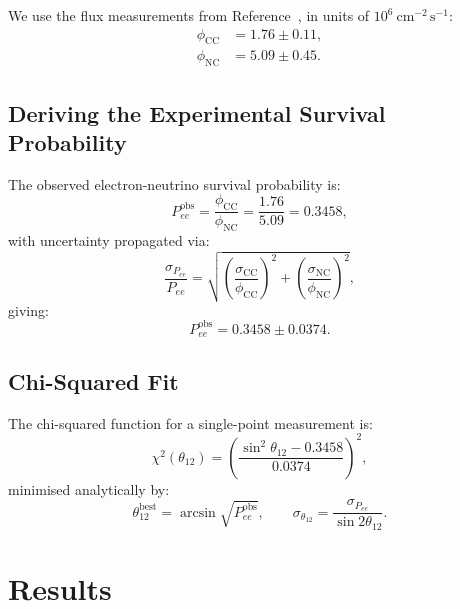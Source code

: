 \documentclass[12pt, a4paper]{article}
\begin{document}
We use the flux measurements from Reference~\cite{SNO2002}, in units of
$10^6\ \text{cm}^{-2}\,\text{s}^{-1}$:
\begin{align}
    \phi_\text{CC} &= 1.76 \pm 0.11, \label{eq:phicc}\\
    \phi_\text{NC} &= 5.09 \pm 0.45. \label{eq:phinc}
\end{align}
 
\subsection{Deriving the Experimental Survival Probability}
 
The observed electron-neutrino survival probability is:
\begin{equation}
    P_{ee}^{\text{obs}}
    = \frac{\phi_\text{CC}}{\phi_\text{NC}}
    = \frac{1.76}{5.09}
    = 0.3458,
    \label{eq:peeobs}
\end{equation}
with uncertainty propagated via:
\begin{equation}
    \frac{\sigma_{P_{ee}}}{P_{ee}}
    = \sqrt{\left(\frac{\sigma_\text{CC}}{\phi_\text{CC}}\right)^2
           +\left(\frac{\sigma_\text{NC}}{\phi_\text{NC}}\right)^2},
    \label{eq:errprop}
\end{equation}
giving:
\begin{equation}
    P_{ee}^{\text{obs}} = 0.3458 \pm 0.0374.
    \label{eq:peeobs_final}
\end{equation}
 
\subsection{Chi-Squared Fit}
 
The chi-squared function for a single-point measurement is:
\begin{equation}
    \chi^2(\theta_{12})
    = \left(
        \frac{\sin^2\theta_{12} - 0.3458}{0.0374}
      \right)^2,
    \label{eq:chi2}
\end{equation}
minimised analytically by:
\begin{equation}
    \theta_{12}^{\text{best}}
    = \arcsin\!\sqrt{P_{ee}^{\text{obs}}},
    \qquad
    \sigma_{\theta_{12}}
    = \frac{\sigma_{P_{ee}}}{\sin 2\theta_{12}}.
    \label{eq:bestfit}
\end{equation}
 
\section{Results}
\label{sec:results}
 
\end{document}
